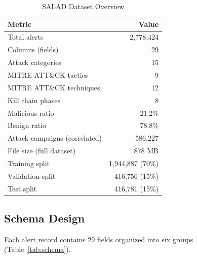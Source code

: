 \documentclass[review]{elsarticle}
\begin{document}
\begin{table}[h]
\centering
\caption{SALAD Dataset Overview}
\label{tab:overview}
\begin{tabular}{lr}
\toprule
\textbf{Metric} & \textbf{Value} \\
\midrule
Total alerts & 2,778,424 \\
Columns (fields) & 29 \\
Attack categories & 15 \\
MITRE ATT\&CK tactics & 9 \\
MITRE ATT\&CK techniques & 12 \\
Kill chain phases & 8 \\
Malicious ratio & 21.2\% \\
Benign ratio & 78.8\% \\
Attack campaigns (correlated) & 586,227 \\
File size (full dataset) & 878 MB \\
\midrule
Training split & 1,944,887 (70\%) \\
Validation split & 416,756 (15\%) \\
Test split & 416,781 (15\%) \\
\bottomrule
\end{tabular}
\end{table}


\subsection{Schema Design}

Each alert record contains 29 fields organized into six groups (Table~\ref{tab:schema}).
\end{document}
